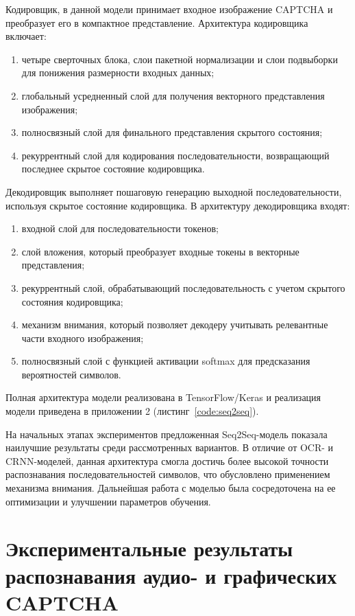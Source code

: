 Кодировщик, в данной модели принимает входное изображение CAPTCHA и преобразует 
его в компактное представление. Архитектура кодировщика включает:

\begin{enumerate}
    \item четыре сверточных блока, слои пакетной нормализации и слои подвыборки 
    для понижения размерности входных данных;
    \item глобальный усредненный слой для получения векторного представления 
    изображения;
    \item полносвязный слой для финального представления скрытого состояния;
    \item рекуррентный слой для кодирования последовательности, возвращающий 
    последнее скрытое состояние кодировщика.
\end{enumerate}

Декодировщик выполняет пошаговую генерацию выходной последовательности, используя 
скрытое состояние кодировщика. В архитектуру декодировщика входят:

\begin{enumerate}
    \item входной слой для последовательности токенов;
    \item слой вложения, который преобразует входные токены в векторные 
    представления;
    \item рекуррентный слой, обрабатывающий последовательность с учетом скрытого 
    состояния кодировщика;
    \item механизм внимания, который позволяет декодеру учитывать релевантные 
    части входного изображения;
    \item полносвязный слой с функцией активации softmax для предсказания 
    вероятностей символов.
\end{enumerate}

Полная архитектура модели реализована в TensorFlow/Keras и реализация модели 
приведена в приложении 2 (листинг~\ref{code:seq2seq}).

На начальных этапах экспериментов предложенная Seq2Seq-модель показала наилучшие 
результаты среди рассмотренных вариантов. В отличие от OCR- и CRNN-моделей, 
данная архитектура смогла достичь более высокой точности распознавания 
последовательностей символов, что обусловлено применением механизма внимания. 
Дальнейшая работа с моделью была сосредоточена на ее оптимизации и улучшении 
параметров обучения.

\section{Экспериментальные результаты распознавания аудио- и графических CAPTCHA}

